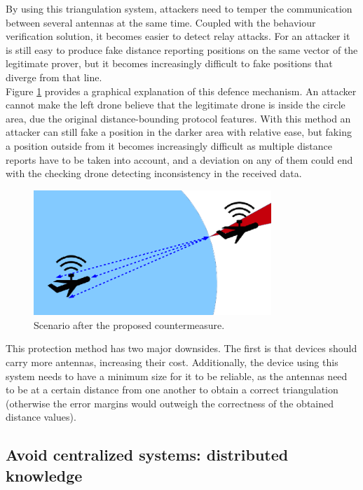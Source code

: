 \documentclass{article}
\begin{document}
By using this triangulation system, attackers need to temper the communication between several antennas at the same time. Coupled with the behaviour verification solution, it becomes easier to detect relay attacks. For an attacker it is still easy to produce fake distance reporting positions on the same vector of the legitimate prover, but it becomes increasingly difficult to fake positions that diverge from that line.\\

Figure \ref{fig:attackexample3} provides a graphical explanation of this defence mechanism. An attacker cannot make the left drone believe that the legitimate drone is inside the circle area, due the original distance-bounding protocol features. With this method an attacker can still fake a position in the darker area with relative ease, but faking a position outside from it becomes increasingly difficult as multiple distance reports have to be taken into account, and a deviation on any of them could end with the checking drone detecting inconsistency in the received data.\\

  \begin{figure}[h!]
  \centering
    \includegraphics[width=0.8\textwidth]{images/attack3.png}
  \caption{Scenario after the proposed countermeasure.}
  \label{fig:attackexample3}
\end{figure}

This protection method has two major downsides. The first is that devices should carry more antennas, increasing their cost. Additionally, the device using this system needs to have a minimum size for it to be reliable, as the antennas need to be at a certain distance from one another to obtain a correct triangulation (otherwise the error margins would outweigh the correctness of the obtained distance values).\\

\subsection{Avoid centralized systems: distributed knowledge}
\end{document}
